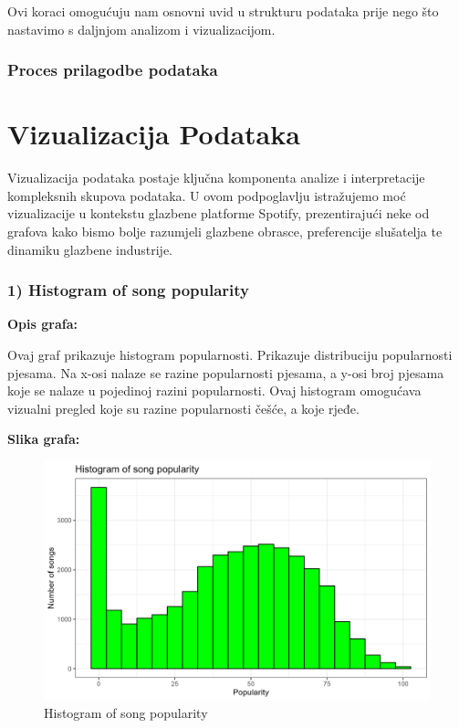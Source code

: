 		Ovi koraci omogućuju nam osnovni uvid u strukturu podataka prije nego što nastavimo s daljnjom analizom i vizualizacijom.

	
	\subsubsection{Proces prilagodbe podataka}
	



\section{Vizualizacija Podataka}
	Vizualizacija podataka postaje ključna komponenta analize i interpretacije kompleksnih skupova podataka. 
	U ovom podpoglavlju istražujemo moć vizualizacije u kontekstu glazbene platforme Spotify, prezentirajući neke od grafova kako bismo bolje razumjeli glazbene obrasce, preferencije slušatelja te dinamiku glazbene industrije.
	
	\subsubsection{1) Histogram of song popularity}
	
	\textbf{Opis grafa:}
	
	Ovaj graf prikazuje histogram popularnosti. Prikazuje distribuciju popularnosti pjesama. Na x-osi nalaze se razine popularnosti pjesama, a y-osi broj pjesama koje se nalaze u pojedinoj razini popularnosti.
	Ovaj histogram omogućava vizualni pregled koje su razine popularnosti češće, a koje rjeđe. 

	\textbf{Slika grafa:}
	\begin{figure}[H]
		\includegraphics[scale=0.9]{slike/Histogram of song popularity.png}
		\centering
		\caption{Histogram of song popularity}
		
	\end{figure}

